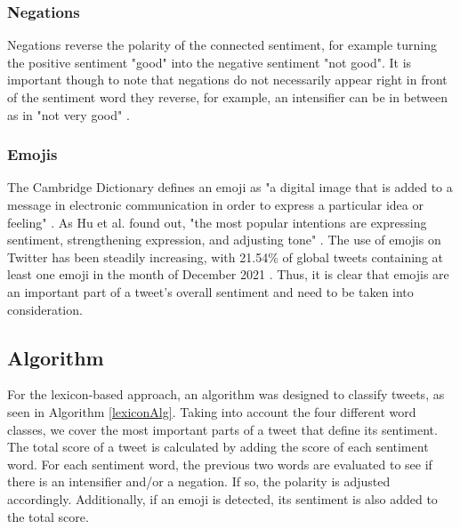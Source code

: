 \subsubsection{Negations}
Negations reverse the polarity of the connected sentiment, for example turning the positive sentiment "good" into the negative sentiment "not good". It is important though to note that negations do not necessarily appear right in front of the sentiment word they reverse, for example, an intensifier can be in between as in "not very good" \cite{10.1162/COLI_a_00049}.


\subsubsection{Emojis}
The Cambridge Dictionary defines an emoji as "a digital image that is added to a message in electronic communication in order to express a particular idea or feeling" \cite{cambridgeEmoji}. As Hu et al. found out, "the most popular intentions are expressing sentiment, strengthening expression, and adjusting tone" \cite[p.~109]{Hu_Guo_Sun_Nguyen_Luo_2017}. The use of emojis on Twitter has been steadily increasing, with 21.54\% of global tweets containing at least one emoji in the month of December 2021 \cite{emojiStatistic}. Thus, it is clear that emojis are an important part of a tweet's overall sentiment and need to be taken into consideration.



\subsection{Algorithm}

For the lexicon-based approach, an algorithm was designed to classify tweets, as seen in Algorithm \ref{lexiconAlg}. Taking into account the four different word classes, we cover the most important parts of a tweet that define its sentiment. The total score of a tweet is calculated by adding the score of each sentiment word. For each sentiment word, the previous two words are evaluated to see if there is an intensifier and/or a negation. If so, the polarity is adjusted accordingly. Additionally, if an emoji is detected, its sentiment is also added to the total score.

